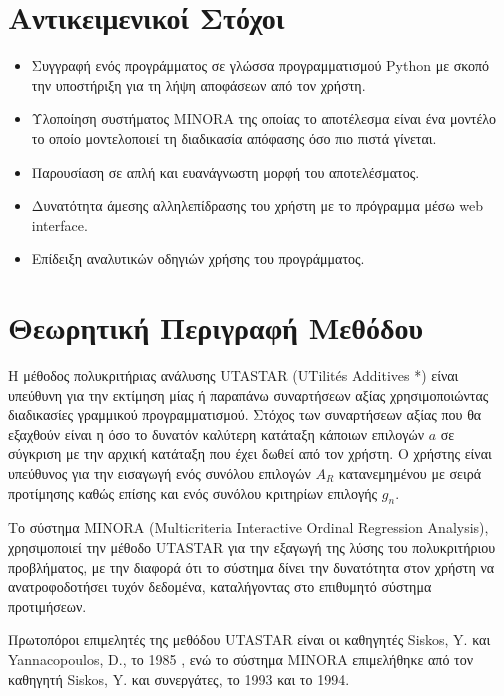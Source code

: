 \documentclass[11pt,a4paper,titlepage]{article}
\numberwithin{equation}{section}
\begin{document}

\section{Αντικειμενικοί Στόχοι}
\label{sec:goals}   
\begin{itemize}
	\item Συγγραφή ενός προγράμματος σε γλώσσα προγραμματισμού Python με σκοπό την υποστήριξη για τη λήψη αποφάσεων από τον χρήστη.
	\item Υλοποίηση συστήματος MINORA της οποίας το αποτέλεσμα είναι ένα μοντέλο το οποίο μοντελοποιεί τη διαδικασία απόφασης όσο πιο πιστά γίνεται.
	\item Παρουσίαση σε απλή και ευανάγνωστη μορφή του αποτελέσματος.
	\item Δυνατότητα άμεσης αλληλεπίδρασης του χρήστη με το πρόγραμμα μέσω web interface.
	\item Επίδειξη αναλυτικών οδηγιών χρήσης του προγράμματος.
\end{itemize}


\section{Θεωρητική Περιγραφή Μεθόδου}
\label{sec:theory}
Η μέθοδος πολυκριτήριας ανάλυσης UTASTAR (UTilités Additives *) είναι υπεύθυνη για την εκτίμηση μίας ή παραπάνω συναρτήσεων αξίας χρησιμοποιώντας διαδικασίες γραμμικού προγραμματισμού. Στόχος των συναρτήσεων αξίας που θα εξαχθούν είναι η όσο το δυνατόν καλύτερη κατάταξη κάποιων επιλογών $a$ σε σύγκριση με την αρχική κατάταξη που έχει δωθεί από τον χρήστη. Ο χρήστης είναι υπεύθυνος για την εισαγωγή ενός συνόλου επιλογών $A_{R}$ κατανεμημένου με σειρά προτίμησης καθώς επίσης και ενός συνόλου κριτηρίων επιλογής $g_{n}$. 

Το σύστημα MINORA (Multicriteria Interactive Ordinal Regression Analysis), χρησιμοποιεί την μέθοδο UTASTAR για την εξαγωγή της λύσης του πολυκριτήριου προβλήματος, με την διαφορά ότι το σύστημα δίνει την δυνατότητα στον χρήστη να ανατροφοδοτήσει τυχόν δεδομένα, καταλήγοντας στο επιθυμητό σύστημα προτιμήσεων.

Πρωτοπόροι επιμελητές της μεθόδου UTASTAR είναι οι καθηγητές Siskos, Y. και Yannacopoulos, D., το 1985 \cite{utastar}, ενώ το σύστημα MINORA επιμελήθηκε από τον καθηγητή Siskos, Y. και συνεργάτες, το 1993 \cite{minora} και το 1994. 
\end{document}
